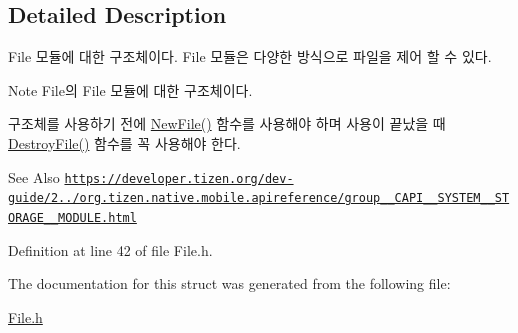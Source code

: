 \subsection{Detailed Description}
File 모듈에 대한 구조체이다. File 모듈은 다양한 방식으로 파일을 제어 할 수 있다. 

\begin{DoxyNote}{Note}
File의 File 모듈에 대한 구조체이다. \par
 구조체를 사용하기 전에 \hyperlink{File_8h_a9dc7e152baf123500677519b3d311532}{New\-File()} 함수를 사용해야 하며 사용이 끝났을 때 \hyperlink{File_8h_ab44ac1360d2598918dd2c655833e10c0}{Destroy\-File()} 함수를 꼭 사용해야 한다. 
\end{DoxyNote}
\begin{DoxySeeAlso}{See Also}
\href{https://developer.tizen.org/dev-guide/2.3.0/org.tizen.native.mobile.apireference/group__CAPI__SYSTEM__STORAGE__MODULE.html}{\tt https\-://developer.\-tizen.\-org/dev-\/guide/2../org.\-tizen.\-native.\-mobile.\-apireference/group\-\_\-\-\_\-\-C\-A\-P\-I\-\_\-\-\_\-\-S\-Y\-S\-T\-E\-M\-\_\-\-\_\-\-S\-T\-O\-R\-A\-G\-E\-\_\-\-\_\-\-M\-O\-D\-U\-L\-E.\-html} 
\end{DoxySeeAlso}


Definition at line 42 of file File.\-h.



The documentation for this struct was generated from the following file\-:\begin{DoxyCompactItemize}
\item 
\hyperlink{File_8h}{File.\-h}\end{DoxyCompactItemize}
